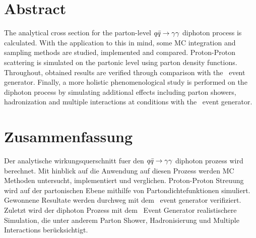 \section*{Abstract}

The analytical cross section for the parton-level \(q\bar{q}\rightarrow\gamma\gamma\) diphoton
process is calculated.  With the application to this in mind, some
MC integration and sampling methods are studied, implemented
and compared. Proton-Proton scattering is simulated on the partonic
level using parton density functions. Throughout, obtained results are
verified through comparison with the \sherpa\ event
generator. Finally, a more holistic phenomenological study is
performed on the diphoton process by simulating additional effects
including parton showers, hadronization and multiple interactions at
\lhc conditions with the \sherpa\ event generator.

\section*{Zusammenfassung}

Der analytische wirkungsquerschnitt fuer den \(q\bar{q}\rightarrow\gamma\gamma\) diphoton
prozess wird berechnet. Mit hinblick auf die Anwendung auf diesen
Prozess werden MC Methoden untersucht, implementiert und
verglichen. Proton-Proton Streuung wird auf der partonischen Ebene
mithilfe von Partondichtefunktionen simuliert.  Gewonnene Resultate
werden durchweg mit dem \sherpa\ event generator verifiziert. Zuletzt
wird der diphoton Prozess mit dem \sherpa\ Event Generator
realistischere Simulation, die unter anderem Parton Shower,
Hadronisierung und Multiple Interactions ber\"ucksichtigt.

